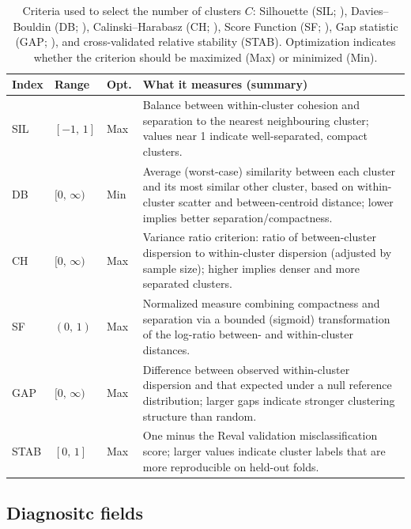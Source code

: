 \documentclass[pdflatex,sn-chicago]{sn-jnl}%
\theoremstyle{plain}
\theoremstyle{definition}
\theoremstyle{remark}
\theoremstyle{definition}
\begin{document}
\begin{table}[t]
\centering
\caption{Criteria used to select the number of clusters $C$: Silhouette (SIL; \citealp{rousseeuw1987silhouettes}), Davies--Bouldin (DB; \citealp{davies2009cluster}), Calinski--Harabasz (CH; \citealp{calinski1974dendrite}), Score Function (SF; \citealp{saitta2008comprehensive}), Gap statistic (GAP; \citealp{tibshirani2001estimating}), and cross-validated relative stability (STAB). Optimization indicates whether the criterion should be maximized (Max) or minimized (Min).}
\label{tab:cvi_summary}
\begin{tabular}{p{0.8cm}p{1cm}p{0.8cm}p{7.2cm}}
\toprule
\textbf{Index} & \textbf{Range} & \textbf{Opt.} & \textbf{What it measures (summary)} \\
\midrule
SIL & $[-1,\,1]$ & Max &
Balance between within-cluster cohesion and separation to the nearest neighbouring cluster; values near 1 indicate well-separated, compact clusters. \\
DB  & $[0,\,\infty)$ & Min &
Average (worst-case) similarity between each cluster and its most similar other cluster, based on within-cluster scatter and between-centroid distance; lower implies better separation/compactness. \\
CH  & $[0,\,\infty)$ & Max &
Variance ratio criterion: ratio of between-cluster dispersion to within-cluster dispersion (adjusted by sample size); higher implies denser and more separated clusters. \\
SF  & $(0,\,1)$ & Max &
Normalized measure combining compactness and separation via a bounded (sigmoid) transformation of the log-ratio between- and within-cluster distances. \\
GAP & $[0,\,\infty)$ & Max &
Difference between observed within-cluster dispersion and that expected under a null reference distribution; larger gaps indicate stronger clustering structure than random. \\
STAB & $[0,\,1]$ & Max &
One minus the Reval validation misclassification score; larger values indicate cluster labels that are more reproducible on held-out folds. \\
\bottomrule
\end{tabular}
\end{table}



\subsection{Diagnositc fields}
\end{document}
